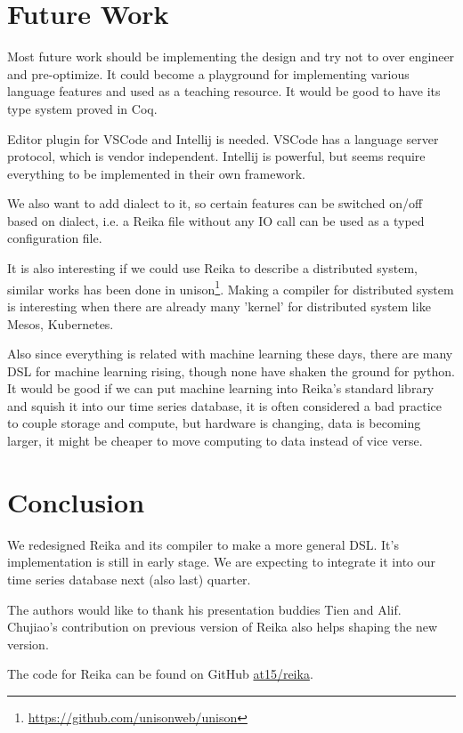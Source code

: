 \documentclass{article}
\begin{document}
\section{Future Work}
\label{sec:future-work}

Most future work should be implementing the design and try not to over engineer and pre-optimize.
It could become a playground for implementing various language features and used as a teaching resource.
It would be good to have its type system proved in Coq.

Editor plugin for VSCode and Intellij is needed.
VSCode has a language server protocol, which is vendor independent.
Intellij is powerful, but seems require everything to be implemented in their own framework.

We also want to add dialect to it, so certain features can be switched on/off based on dialect,
i.e. a Reika file without any IO call can be used as a typed configuration file.

It is also interesting if we could use Reika to describe a distributed system, similar works has been
done in unison\footnote{\url{https://github.com/unisonweb/unison}}.
Making a compiler for distributed system is interesting
when there are already many 'kernel' for distributed system like Mesos, Kubernetes.

Also since everything is related with machine learning these days, there are many DSL for machine learning rising,
though none have shaken the ground for python.
It would be good if we can put machine learning into Reika's standard library and squish it into our time series database,
it is often considered a bad practice to couple storage and compute, but hardware is changing,
data is becoming larger, it might be cheaper to move computing to data instead of vice verse.

\section{Conclusion}
\label{sec:conclusion}

We redesigned Reika and its compiler to make a more general DSL.
It's implementation is still in early stage.
We are expecting to integrate it into our time series database next (also last) quarter.

The authors would like to thank his presentation buddies Tien and Alif.
Chujiao's contribution on previous version of Reika also helps shaping the new version.

The code for Reika can be found on GitHub \href{https://github.com/at15/reika}{at15/reika}.
\end{document}
